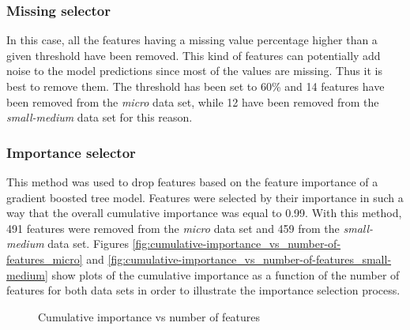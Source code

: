 \documentclass[LaM,binding=0.6cm, english]{sapthesis}
\begin{document}
\subsubsection{Missing selector}

In this case, all the features having a missing value percentage higher than a given threshold have been removed. This kind of features can potentially add noise to the model predictions since most of the values are missing. Thus it is best to remove them. The threshold has been set to 60\% and 14 features have been removed from the \textit{micro} data set, while 12 have been removed from the \textit{small-medium} data set for this reason.

\subsubsection{Importance selector}

This method was used to drop features based on the feature importance of a gradient boosted tree model. Features were selected by their importance in such a way that the overall cumulative importance was equal to 0.99. With this method, 491 features were removed from the \textit{micro} data set and 459 from the \textit{small-medium} data set. Figures \ref{fig:cumulative-importance_vs_number-of-features_micro} and \ref{fig:cumulative-importance_vs_number-of-features_small-medium} show plots of the cumulative importance as a function of the number of features for both data sets in order to illustrate the importance selection process.

\begin{figure}[!ht]
  \centering
  \hfill
  \caption{Cumulative importance vs number of features}
\end{figure}
\end{document}
